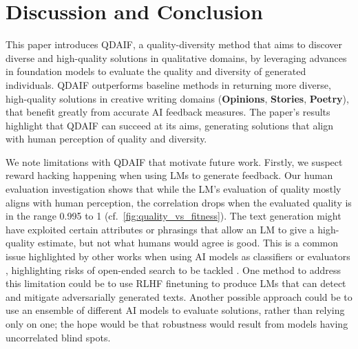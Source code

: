\section{Discussion and Conclusion}
This paper introduces QDAIF, a quality-diversity method that aims to discover diverse and high-quality solutions in qualitative domains, by leveraging advances in foundation models to evaluate the quality and diversity of generated individuals. QDAIF outperforms baseline methods in returning more diverse, high-quality solutions in creative writing domains (\textbf{Opinions}, \textbf{Stories}, \textbf{Poetry}), that benefit greatly from accurate AI feedback measures. The paper's results highlight that QDAIF can succeed at its aims, generating solutions that align with human perception of quality and diversity. 

We note limitations with QDAIF that motivate future work. Firstly, we suspect reward hacking happening when using LMs to generate feedback. Our human evaluation investigation shows that while the LM's evaluation of quality mostly aligns with human perception, the correlation drops when the evaluated quality is in the range 0.995 to 1 (cf.~\cref{fig:quality_vs_fitness}). The text generation might have exploited certain attributes or phrasings that allow an LM to give a high-quality estimate, but not what humans would agree is good. This is a common issue highlighted by other works when using AI models as classifiers or evaluators \citep{nguyen2015deep}, highlighting risks of open-ended search to be tackled \citep{ecoffet2020open}. One method to address this limitation could be to use RLHF finetuning \citep{ouyang2022training} to produce LMs that can detect and mitigate adversarially generated texts. Another possible approach could be to use an ensemble of different AI models to evaluate solutions, rather than relying only on one; the hope would be that robustness would result from models having uncorrelated blind spots.

